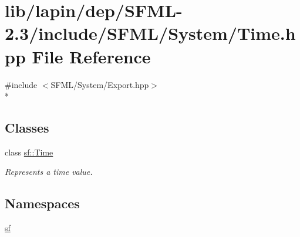 \hypertarget{lapin_2dep_2_s_f_m_l-2_83_2include_2_s_f_m_l_2_system_2_time_8hpp}{\section{lib/lapin/dep/\-S\-F\-M\-L-\/2.3/include/\-S\-F\-M\-L/\-System/\-Time.hpp File Reference}
\label{lapin_2dep_2_s_f_m_l-2_83_2include_2_s_f_m_l_2_system_2_time_8hpp}
}
{\ttfamily \#include $<$S\-F\-M\-L/\-System/\-Export.\-hpp$>$}\\*
\subsection*{Classes}
\begin{DoxyCompactItemize}
\item 
class \hyperlink{classsf_1_1_time}{sf\-::\-Time}
\begin{DoxyCompactList}\small\item\em Represents a time value. \end{DoxyCompactList}\end{DoxyCompactItemize}
\subsection*{Namespaces}
\begin{DoxyCompactItemize}
\item 
\hyperlink{namespacesf}{sf}
\end{DoxyCompactItemize}
